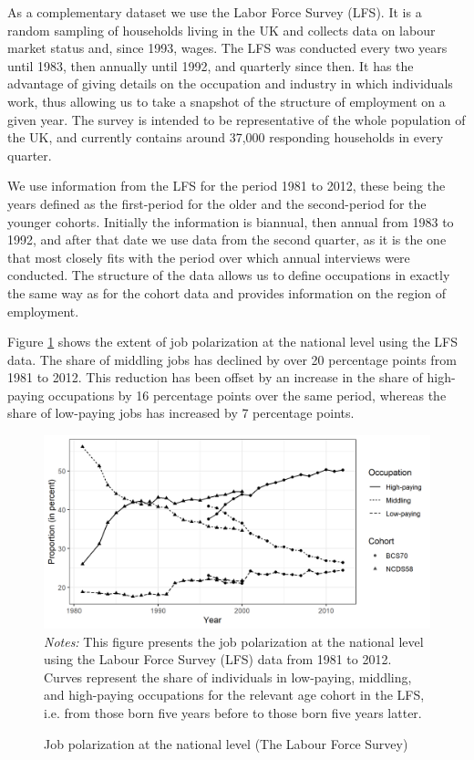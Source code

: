 As a complementary dataset we use the Labor Force Survey (LFS). It is a random sampling of households living in the UK and collects data on labour market status and, since 1993, wages. The LFS was conducted every two years until 1983, then annually until 1992, and quarterly since then. It has the advantage of giving details on the occupation and industry in which individuals work, thus allowing us to take a snapshot of the structure of employment on a given year. The survey is intended to be representative of the whole population of the UK, and currently contains around 37,000 responding households in every quarter.

We use information from the LFS for the period 1981 to 2012, these being the years defined as the first-period for the older and the second-period for the younger cohorts. Initially the information is biannual, then annual from 1983 to 1992, and after that date we use data from the second quarter, as it is the one that most closely fits with the period over which annual interviews were conducted. The structure of the data allows us to define occupations in exactly the same way as for the cohort data and provides information on the region of employment.

Figure \ref{chap2-fig:lfs-national} shows the extent of job polarization at the national level using the LFS data. The share of middling jobs has declined by over 20 percentage points from 1981 to 2012. This reduction has been offset by an increase in the share of high-paying occupations by 16 percentage points over the same period, whereas the share of low-paying jobs has increased by 7 percentage points.
\begin{figure}[!htb]
    \centering
    \caption{Job polarization at the national level (The Labour Force Survey)}
    \label{chap2-fig:lfs-national}
    \includegraphics[width=\linewidth]{chap2/graphic/lfs-national.png}
	\vspace{-3em}
	\justify\singlespacing\footnotesize{\textit{Notes:} This figure presents the job polarization at the national level using the Labour Force Survey (LFS) data from 1981 to 2012. Curves represent the share of individuals in low-paying, middling, and high-paying occupations for the relevant age cohort in the LFS, i.e. from those born five years before to those born five years latter.}
\end{figure}

